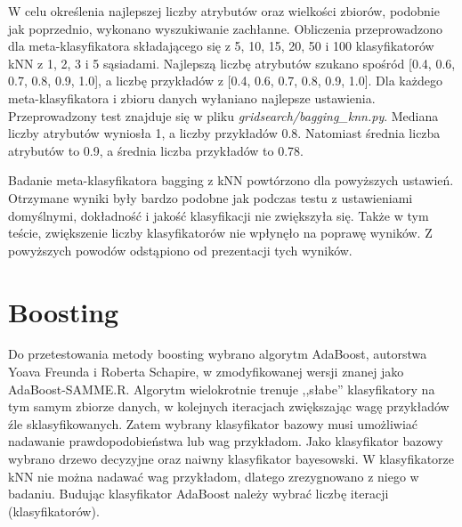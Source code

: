 W celu określenia najlepszej liczby atrybutów oraz wielkości zbiorów, podobnie jak poprzednio, wykonano wyszukiwanie zachłanne. Obliczenia przeprowadzono dla meta-klasyfikatora składającego się z 5, 10, 15, 20, 50 i 100 klasyfikatorów kNN z 1, 2, 3 i 5 sąsiadami. Najlepszą liczbę atrybutów szukano spośród [0.4, 0.6, 0.7, 0.8, 0.9, 1.0], a liczbę przykładów z [0.4, 0.6, 0.7, 0.8, 0.9, 1.0]. Dla każdego meta-klasyfikatora i zbioru danych wyłaniano najlepsze ustawienia. Przeprowadzony test znajduje się w pliku \textit{gridsearch/bagging\_knn.py}. Mediana liczby atrybutów wyniosła 1, a liczby przykładów 0.8. Natomiast średnia liczba atrybutów to 0.9, a średnia liczba przykładów to 0.78. \par
Badanie meta-klasyfikatora bagging z kNN powtórzono dla powyższych ustawień. Otrzymane wyniki były bardzo podobne jak podczas testu z ustawieniami domyślnymi, dokładność i jakość klasyfikacji nie zwiększyła się. Także w tym teście, zwiększenie liczby klasyfikatorów nie wpłynęło na poprawę wyników. Z powyższych powodów odstąpiono od prezentacji tych wyników.



\section{Boosting}
Do przetestowania metody boosting wybrano algorytm AdaBoost, autorstwa Yoava Freunda i Roberta Schapire, w zmodyfikowanej wersji znanej jako AdaBoost-SAMME.R. Algorytm wielokrotnie trenuje ,,słabe'' klasyfikatory na tym samym zbiorze danych, w kolejnych iteracjach zwiększając wagę przykładów źle sklasyfikowanych. Zatem wybrany klasyfikator bazowy musi umożliwiać nadawanie prawdopodobieństwa lub wag przykładom. Jako klasyfikator bazowy wybrano drzewo decyzyjne oraz naiwny klasyfikator bayesowski. W klasyfikatorze kNN nie można nadawać wag przykładom, dlatego zrezygnowano z niego w badaniu. Budując klasyfikator AdaBoost należy wybrać liczbę iteracji (klasyfikatorów).

